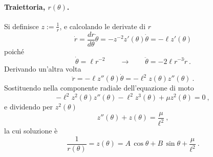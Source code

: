 \paragraph{Traiettoria, $r(\theta)$.} Si definisce $z := \frac{1}{r}$, e calcolando le derivate di $r$
\begin{equation}
    \dot{r} = \dfrac{d r}{d \theta} \dot{\theta} = - z^{-2} z'(\theta) \dot{\theta} = - \ell z'(\theta) 
\end{equation}
poiché
\begin{equation}
    \dot{\theta} = \ell r^{-2} \qquad \rightarrow \qquad \ddot{\theta} = -2 \ell r^{-3} \dot{r} \ .
\end{equation}
Derivando un'altra volta
\begin{equation}
    \ddot{r} = - \ell z''(\theta) \dot{\theta} = - \ell^2 z(\theta) z''(\theta)\ .
\end{equation}
Sostituendo nella componente radiale dell'equazione di moto
\begin{equation}
    - \ell^2 z^2(\theta) z''(\theta) - \ell^2 z^3(\theta) + \mu z^2(\theta) = 0 \ ,
\end{equation}
e dividendo per $z^2(\theta)$
\begin{equation}
    z''(\theta) + z(\theta) = \frac{\mu}{\ell^2} \ ,
\end{equation}
la cui soluzione è
\begin{equation}
    \dfrac{1}{r(\theta)} = z(\theta) = A \, \cos \theta + B \, \sin \theta + \frac{\mu}{\ell^2} \ .
\end{equation}

